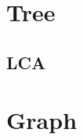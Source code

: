 \documentclass[a4paper,10pt,twocolumn,oneside]{article}
\begin{document}
% 

\section{Tree}

\subsection{LCA}


\section{Graph}

% 

% 

% 
% 

% 
% 

%

% 
\end{document}
